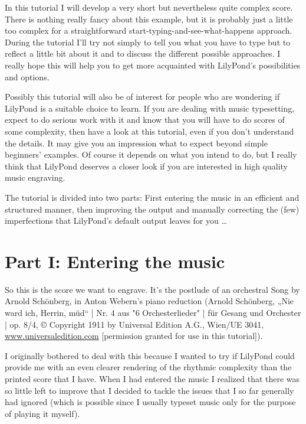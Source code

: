 \documentclass[../../LilyPond-Tutorials]{subfiles}
\begin{document}
In this tutorial I will develop a very short but nevertheless quite complex score. 
There is nothing really fancy about this example, but it is probably just a little too complex for a straightforward start-typing-and-see-what-happens approach. 
During the tutorial I'll try not simply to tell you what you have to type but to reflect a little bit about it and to discuss the different possible approaches. 
I really hope this will help you to get more acquainted with LilyPond's possibilities and options.

Possibly this tutorial will also be of interest for people who are wondering if LilyPond is a suitable choice to learn. 
If you are dealing with music typesetting, expect to do serious work with it and know that you will have to do scores of some complexity, then have a look at this tutorial, even if you don't understand the details. 
It may give you an impression what to expect beyond simple beginners' examples. 
Of course it depends on what you intend to do, but I really think that LilyPond deserves a closer look if you are interested in high quality music engraving.

The tutorial is divided into two parts: First entering the music in an efficient and structured manner, then improving the output and manually correcting the (few) imperfections that LilyPond's default output leaves for you \dots

\section{Part I: Entering the music}

So this is the score we want to engrave. 
It's the postlude of an orchestral Song by Arnold Schönberg, in Anton Webern's piano reduction (Arnold Schönberg, „Nie ward ich, Herrin, müd“ | Nr. 4 aus "6 Orchesterlieder" | für Gesang und Orchester | op. 8/4, © Copyright 1911 by Universal Edition A.G., Wien/UE 3041, \url{www.universaledition.com} [permission granted for use in this tutorial]). 


I originally bothered to deal with this because I wanted to try if LilyPond could provide me with an even clearer rendering of the rhythmic complexity than the printed score that I have. 
When I had entered the music I realized that there was so little left to improve that I decided to tackle the issues that I so far generally had ignored (which is possible since I usually typeset music only for the purpose of playing it myself).
\end{document}
